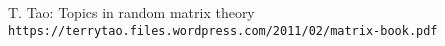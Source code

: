 \begin{thebibliography}{9}
T. Tao: Topics in random matrix theory
\\\texttt{https://terrytao.files.wordpress.com/2011/02/matrix-book.pdf}
\end{thebibliography}



